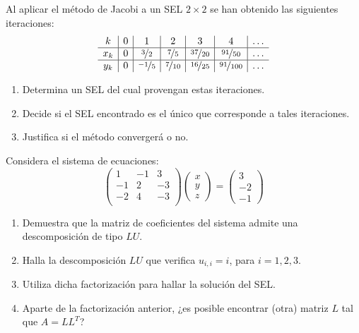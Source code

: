 \documentclass[12pt]{article}
\begin{document}
	\begin{ejercicio}
		Al aplicar el método de Jacobi a un SEL $2 \times 2$ se han obtenido las siguientes iteraciones:
		$$ \begin{array}{c|c|c|c|c|c|c}
			k & 0 & 1 & 2 & 3 & 4 & \ldots \\
			\hline
			x_k & 0 & \nicefrac{3}{2} & \nicefrac{7}{5} & \nicefrac{37}{20} & \nicefrac{91}{50} & \ldots \\
			\hline
			y_k & 0 & \nicefrac{-1}{5} & \nicefrac{7}{10} & \nicefrac{16}{25} & \nicefrac{91}{100} & \ldots 
		\end{array}$$
		
		\begin{enumerate}[label=\alph*)]
			\item Determina un SEL del cual provengan estas iteraciones.
			
			\item Decide si el SEL encontrado es el único que corresponde a tales iteraciones.
			
			\item Justifica si el método convergerá o no.
		\end{enumerate}
	\end{ejercicio}
	
	\begin{ejercicio}
		Considera el sistema de ecuaciones:
		$$ \begin{pmatrix}
			1 & -1 & 3 \\
			-1 & 2 & -3 \\
			-2 & 4 & -3 \\
		\end{pmatrix} 
		\begin{pmatrix}
			x \\
			y \\
			z
		\end{pmatrix} = 
		\begin{pmatrix}
			3 \\
			-2 \\
			-1
		\end{pmatrix}$$
		
		\begin{enumerate}[label=\alph*)] 
			\item Demuestra que la matriz de coeficientes del sistema admite una descomposición de tipo $LU$.
			
			\item Halla la descomposición $LU$ que verifica $u_{i,i} = i$, para $i = 1, 2, 3$.
			
			\item Utiliza dicha factorización para hallar la solución del SEL.
			
			\item Aparte de la factorización anterior, ¿es posible encontrar (otra) matriz $L$ tal que $A = L L^T$?
		\end{enumerate}
	\end{ejercicio}
	
\end{document}
